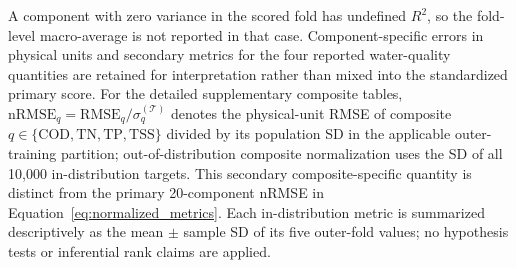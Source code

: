 \documentclass[a4paper,fleqn]{cas-sc}
\begin{document}
A component with zero variance in the scored fold has undefined $R^2$, so the fold-level macro-average is not reported in that case. Component-specific errors in physical units and secondary metrics for the four reported water-quality quantities are retained for interpretation rather than mixed into the standardized primary score. For the detailed supplementary composite tables, $\mathrm{nRMSE}_q=\mathrm{RMSE}_q/\sigma_q^{(\mathcal{T})}$ denotes the physical-unit RMSE of composite $q\in\{\mathrm{COD},\mathrm{TN},\mathrm{TP},\mathrm{TSS}\}$ divided by its population SD in the applicable outer-training partition; out-of-distribution composite normalization uses the SD of all 10,000 in-distribution targets. This secondary composite-specific quantity is distinct from the primary 20-component nRMSE in Equation~\eqref{eq:normalized_metrics}. Each in-distribution metric is summarized descriptively as the mean $\pm$ sample SD of its five outer-fold values; no hypothesis tests or inferential rank claims are applied.
\end{document}
